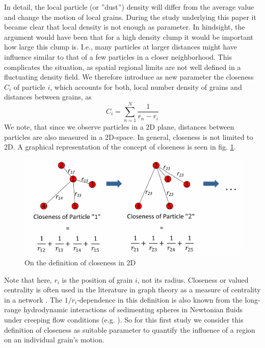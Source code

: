 In detail, the local particle (or ''dust'') density will differ from the average value and change the motion of local grains. During the study underlying this paper it became clear that local density is not enough as parameter. In hindsight, the argument would have been that for a high density clump it would be important how large this clump is. I.e., many particles at larger distances might have influence similar to that of a few particles in a closer neighborhood. This complicates the situation, as spatial regional limits are not well defined in a fluctuating density field. We therefore introduce as new parameter the closeness $C_i$ of particle $i$, which accounts for both, local number density of grains and distances between grains, as
\begin{equation}
\label{eq.close}
C_i = \sum_{n=1}^N \frac{1}{r_n-r_i}
\end{equation}
{We note, that since we observe particles in a 2D plane, distances between particles are also measured in a 2D-space. In general, closeness is not limited to 2D.}
A graphical representation of the concept of closeness is seen in fig. \ref{fig.closing}.
\begin{figure}[h]
\includegraphics[width=\columnwidth]{closeness2.pdf}
    \caption{\label{fig.closing}On the definition of closeness {in 2D}}
\end{figure}
Note that here, $r_i$ is the position of grain $i$, not its radius.
Closeness or valued centrality is often used in the literature in graph theory as a measure of centrality in a network \citep{marchiori2000, Dekker2005}.
The $1/r_i$-dependence in this definition is also known from the long-range hydrodynamic interactions of sedimenting spheres in Newtonian fluids under creeping flow conditions (e.g. \citet{brady1988,Segre1997,janosi1997}).
So for this first study we consider this definition of closeness as suitable parameter to quantify the influence of a region on an individual grain's motion.

